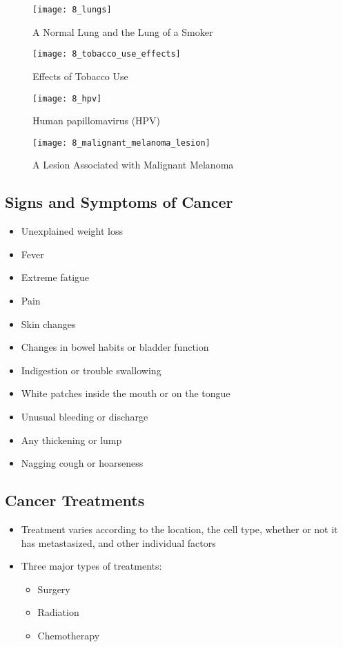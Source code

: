 \documentclass[title={Chapter 8}]{fdsn201notes}
\begin{document}
\begin{figure}[H]
	\centering
	\texttt{[image: 8\_lungs]}
	\caption{A Normal Lung and the Lung of a Smoker}
	\label{fig:lungs}
\end{figure}


\begin{figure}[H]
	\centering
	\texttt{[image: 8\_tobacco\_use\_effects]}
	\caption{Effects of Tobacco Use}
	\label{fig:tobacco-use-effects}
\end{figure}


\begin{figure}[H]
	\centering
	\texttt{[image: 8\_hpv]}
	\caption{Human papillomavirus (HPV)}
	\label{fig:hpv}
\end{figure}


\begin{figure}[H]
	\centering
	\texttt{[image: 8\_malignant\_melanoma\_lesion]}
	\caption{A Lesion Associated with Malignant Melanoma}
	\label{fig:malignant_melanoma_lesion}
\end{figure}


\subsection{Signs and Symptoms of Cancer}\label{subsec:signs-and-symptoms-of-cancer}
\begin{itemize}
	\item Unexplained weight loss
	\item Fever
	\item Extreme fatigue
	\item Pain
	\item Skin changes
	\item Changes in bowel habits or bladder function
	\item Indigestion or trouble swallowing
	\item White patches inside the mouth or on the tongue
	\item Unusual bleeding or discharge
	\item Any thickening or lump
	\item Nagging cough or hoarseness
\end{itemize}

\subsection{Cancer Treatments}\label{subsec:cancer-treatments}
\begin{itemize}
	\item Treatment varies according to the location, the cell type, whether or not it has metastasized, and other individual factors
	\item Three major types of treatments:
	\begin{itemize}
		\item Surgery
		\item Radiation
		\item Chemotherapy
	\end{itemize}
\end{itemize}
\end{document}
